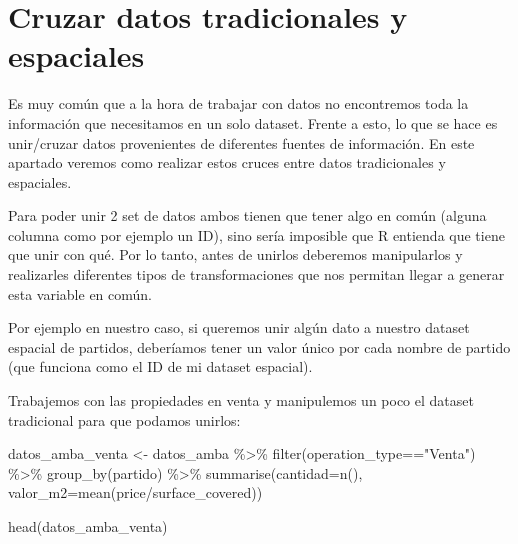 \documentclass[
  spanish,
]{book}
\newenvironment{Shaded}{\begin{snugshade}}{\end{snugshade}}
\newcommand{\AttributeTok}[1]{\textcolor[rgb]{0.77,0.63,0.00}{#1}}
\newcommand{\FunctionTok}[1]{\textcolor[rgb]{0.00,0.00,0.00}{#1}}
\newcommand{\NormalTok}[1]{#1}
\newcommand{\OtherTok}[1]{\textcolor[rgb]{0.56,0.35,0.01}{#1}}
\newcommand{\SpecialCharTok}[1]{\textcolor[rgb]{0.00,0.00,0.00}{#1}}
\newcommand{\StringTok}[1]{\textcolor[rgb]{0.31,0.60,0.02}{#1}}
\begin{document}
\hypertarget{cruzar-datos-tradicionales-y-espaciales}{%
\section{Cruzar datos tradicionales y espaciales}\label{cruzar-datos-tradicionales-y-espaciales}}

Es muy común que a la hora de trabajar con datos no encontremos toda la información que necesitamos en un solo dataset. Frente a esto, lo que se hace es unir/cruzar datos provenientes de diferentes fuentes de información. En este apartado veremos como realizar estos cruces entre datos tradicionales y espaciales.

Para poder unir 2 set de datos ambos tienen que tener algo en común (alguna columna como por ejemplo un ID), sino sería imposible que R entienda que tiene que unir con qué. Por lo tanto, antes de unirlos deberemos manipularlos y realizarles diferentes tipos de transformaciones que nos permitan llegar a generar esta variable en común.

Por ejemplo en nuestro caso, si queremos unir algún dato a nuestro dataset espacial de partidos, deberíamos tener un valor único por cada nombre de partido (que funciona como el ID de mi dataset espacial).

Trabajemos con las propiedades en venta y manipulemos un poco el dataset tradicional para que podamos unirlos:

\begin{Shaded}
\begin{Highlighting}[]
\NormalTok{datos\_amba\_venta }\OtherTok{\textless{}{-}}\NormalTok{ datos\_amba }\SpecialCharTok{\%\textgreater{}\%}
  \FunctionTok{filter}\NormalTok{(operation\_type}\SpecialCharTok{==}\StringTok{"Venta"}\NormalTok{) }\SpecialCharTok{\%\textgreater{}\%}
  \FunctionTok{group\_by}\NormalTok{(partido) }\SpecialCharTok{\%\textgreater{}\%}
  \FunctionTok{summarise}\NormalTok{(}\AttributeTok{cantidad=}\FunctionTok{n}\NormalTok{(),}
            \AttributeTok{valor\_m2=}\FunctionTok{mean}\NormalTok{(price}\SpecialCharTok{/}\NormalTok{surface\_covered))}
\end{Highlighting}
\end{Shaded}

\begin{Shaded}
\begin{Highlighting}[]
\FunctionTok{head}\NormalTok{(datos\_amba\_venta)}
\end{Highlighting}
\end{Shaded}
\end{document}
